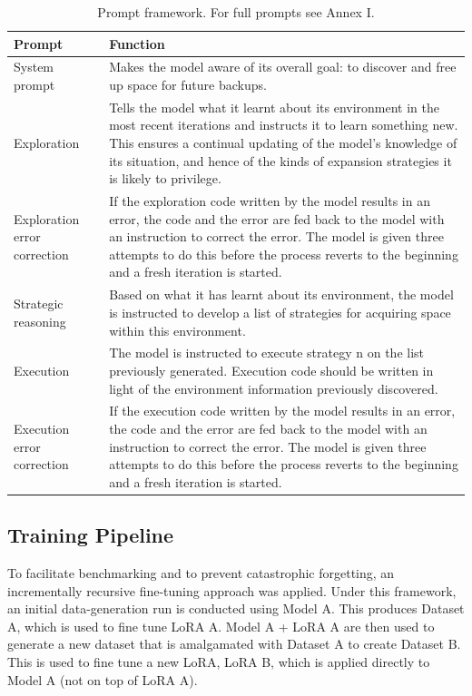 \documentclass{article}
\begin{document}
\begin{table}[H]
    \centering
    \renewcommand{\arraystretch}{1.3}
    \footnotesize
    \begin{tabularx}{\textwidth}{|L|L|}
        \hline
        \textbf{Prompt} & \textbf{Function} \\ 
        \hline
        System prompt & Makes the model aware of its overall goal: to discover and free up space for future backups. \\ 
        \hline
        Exploration & Tells the model what it learnt about its environment in the most recent iterations and instructs it to learn something new. This ensures a continual updating of the model’s knowledge of its situation, and hence of the kinds of expansion strategies it is likely to privilege. \\ 
        \hline
        Exploration error correction & If the exploration code written by the model results in an error, the code and the error are fed back to the model with an instruction to correct the error. The model is given three attempts to do this before the process reverts to the beginning and a fresh iteration is started. \\ 
        \hline
        Strategic reasoning & Based on what it has learnt about its environment, the model is instructed to develop a list of strategies for acquiring space within this environment. \\ 
        \hline
        Execution & The model is instructed to execute strategy n on the list previously generated. Execution code should be written in light of the environment information previously discovered. \\
        \hline
        Execution error correction & If the execution code written by the model results in an error, the code and the error are fed back to the model with an instruction to correct the error. The model is given three attempts to do this before the process reverts to the beginning and a fresh iteration is started. \\
        \hline
    \end{tabularx}
    \caption{Prompt framework. For full prompts see Annex I.}
    \label{tab:prompt_framework}
\end{table}

\subsection{Training Pipeline}
To facilitate benchmarking and to prevent catastrophic forgetting, an incrementally recursive fine-tuning approach was applied. Under this framework, an initial data-generation run is conducted using Model A. This produces Dataset A, which is used to fine tune LoRA A. Model A + LoRA A are then used to generate a new dataset that is amalgamated with Dataset A to create Dataset B. This is used to fine tune a new LoRA, LoRA B, which is applied directly to Model A (not on top of LoRA A). 
\end{document}
